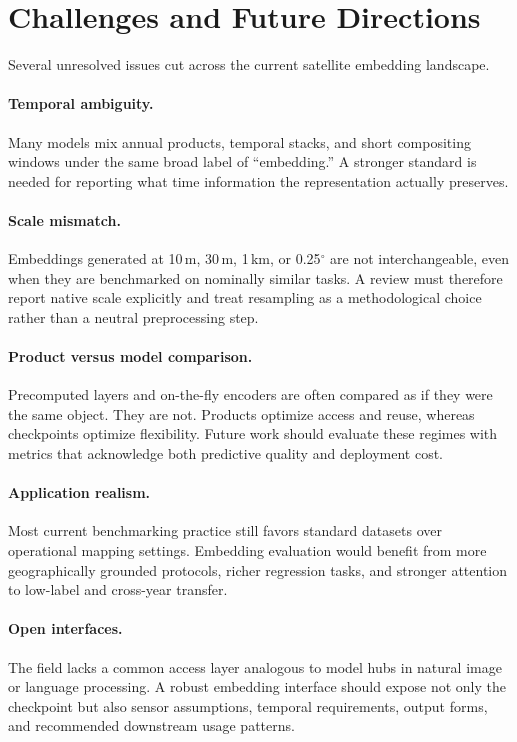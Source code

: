 \section{Challenges and Future Directions}

Several unresolved issues cut across the current satellite embedding landscape.

\paragraph{Temporal ambiguity.}
Many models mix annual products, temporal stacks, and short compositing windows under the same broad label of ``embedding.'' A stronger standard is needed for reporting what time information the representation actually preserves.

\paragraph{Scale mismatch.}
Embeddings generated at 10\,m, 30\,m, 1\,km, or 0.25$^\circ$ are not interchangeable, even when they are benchmarked on nominally similar tasks. A review must therefore report native scale explicitly and treat resampling as a methodological choice rather than a neutral preprocessing step.

\paragraph{Product versus model comparison.}
Precomputed layers and on-the-fly encoders are often compared as if they were the same object. They are not. Products optimize access and reuse, whereas checkpoints optimize flexibility. Future work should evaluate these regimes with metrics that acknowledge both predictive quality and deployment cost.

\paragraph{Application realism.}
Most current benchmarking practice still favors standard datasets over operational mapping settings. Embedding evaluation would benefit from more geographically grounded protocols, richer regression tasks, and stronger attention to low-label and cross-year transfer.

\paragraph{Open interfaces.}
The field lacks a common access layer analogous to model hubs in natural image or language processing. A robust embedding interface should expose not only the checkpoint but also sensor assumptions, temporal requirements, output forms, and recommended downstream usage patterns.
